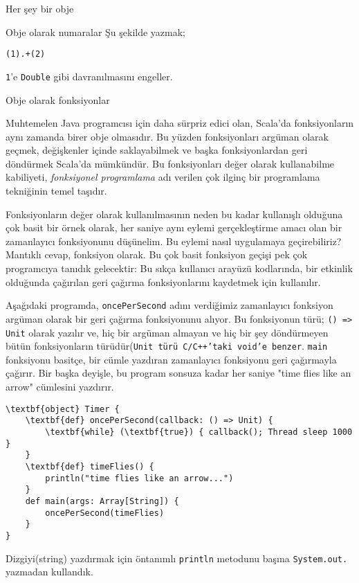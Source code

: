 \documentclass[10pt,a4paper]{book}
\begin{document}
\begin{chapter}{Her şey bir obje}
\begin{section}{Obje olarak numaralar}
Şu şekilde yazmak;

\begin{verbatim}
(1).+(2)
\end{verbatim}

\texttt{1}'e \texttt{Double} gibi davranılmasını engeller.

\end{section}

\begin{section}{Obje olarak fonksiyonlar}

Muhtemelen Java programcısı için daha sürpriz edici olan, Scala'da fonksiyonların aynı zamanda birer obje olmasıdır. Bu yüzden fonksiyonları argüman olarak geçmek, değişkenler içinde saklayabilmek ve başka fonksiyonlardan geri döndürmek Scala'da mümkündür. Bu fonksiyonları değer olarak kullanabilme kabiliyeti, \textit{fonksiyonel programlama} adı verilen çok ilginç bir programlama tekniğinin temel taşıdır.

Fonksiyonların değer olarak kullanılmasının neden bu kadar kullanışlı olduğuna çok basit bir örnek olarak, her saniye aynı eylemi gerçekleştirme amacı olan bir zamanlayıcı fonksiyonunu düşünelim. Bu eylemi nasıl uygulamaya geçirebiliriz? Mantıklı cevap, fonksiyon olarak. Bu çok basit fonksiyon geçişi pek çok programcıya tanıdık gelecektir: Bu sıkça kullanıcı arayüzü kodlarında, bir etkinlik olduğunda çağırılan geri çağırma fonksiyonlarını kaydetmek için kullanılır.

Aşağıdaki programda, \texttt{oncePerSecond} adını verdiğimiz zamanlayıcı fonksiyon argüman olarak bir geri çağırma fonksiyonunu alıyor. Bu fonksiyonun türü; \texttt{() => Unit} olarak yazılır ve, hiç bir argüman almayan ve hiç bir şey döndürmeyen bütün fonksiyonların türüdür(\texttt{Unit türü C/C++'taki \texttt{void}'e benzer}. \texttt{main} fonksiyonu basitçe, bir cümle yazdıran zamanlayıcı fonksiyonu geri çağırmayla çağırır. Bir başka deyişle, bu program sonsuza kadar her saniye "time flies like an arrow" cümlesini yazdırır.

\begin{verbatim}
\textbf{object} Timer {
	\textbf{def} oncePerSecond(callback: () => Unit) {
		\textbf{while} (\textbf{true}) { callback(); Thread sleep 1000 }
	}
	\textbf{def} timeFlies() {
		println("time flies like an arrow...")
	}
	def main(args: Array[String]) {
		oncePerSecond(timeFlies)
	}
}
\end{verbatim}

Dizgiyi(string) yazdırmak için öntanımlı \texttt{println} metodunu başına \texttt{System.out.} yazmadan kullandık.


\end{section}
\end{chapter}
\end{document}
